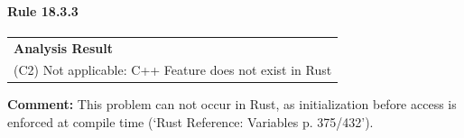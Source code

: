 \paragraph{Rule 18.3.3}
\begin{longtable}{p{13cm}}
\textbf{Analysis Result} \\
(C2) Not applicable: C++ Feature does not exist in Rust \\
\end{longtable}
\textbf{Comment:} This problem can not occur in Rust, as initialization before access is enforced at compile time (`Rust Reference: Variables p. 375/432'). \\
